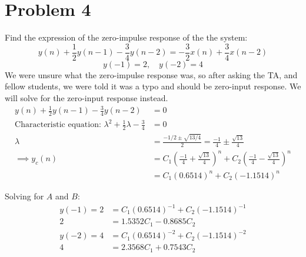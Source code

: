 \documentclass{article}
\begin{document}
\section{Problem 4}
Find the expression of the zero-impulse response of the the system:
\[
    y(n) + \frac{1}{2}y(n-1)-\frac{3}{4}y(n-2) = -\frac{3}{2}x(n) + \frac{3}{4}x(n-2)
\]
\[
    y(-1) = 2, \quad y(-2) = 4
\]
We were unsure what the zero-impulse response was, so after asking the TA, and fellow students, we were told it was a typo and should be zero-input response. We will solve for the zero-input response instead.
\begin{align*}
    y(n) + \frac{1}{2}y(n-1)-\frac{3}{4}y(n-2) &= 0 \\
    \text{Characteristic equation: } \lambda^2 + \frac{1}{2}\lambda - \frac{3}{4} &= 0 \\
    \lambda &= \frac{-1/2 \pm \sqrt{13/4}}{2} = \frac{-1}{4} \pm \frac{\sqrt{13}}{4} \\
    \implies y_c(n) &= C_1\left(\frac{-1}{4} + \frac{\sqrt{13}}{4}\right)^n + C_2\left(\frac{-1}{4} - \frac{\sqrt{13}}{4}\right)^n \\
    &= C_1\left(0.6514\right)^n + C_2\left(-1.1514\right)^n
\end{align*}

Solving for $A$ and $B$:
\begin{align*}
    y(-1) = 2 &= C_1\left(0.6514\right)^{-1} + C_2\left(-1.1514\right)^{-1}\\
    2&= 1.5352C_1 - 0.8685C_2 \\
    y(-2) = 4 &=  C_1\left(0.6514\right)^{-2} + C_2\left(-1.1514\right)^{-2}\\
    4&= 2.3568C_1 + 0.7543C_2
\end{align*}
\end{document}
